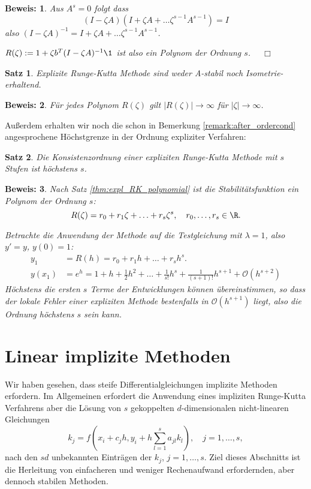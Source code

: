 \documentclass[
]{mycourse}
\theoremstyle{mythm}
\newtheorem{theorem}{Satz}[chapter]
\theoremstyle{break}
\newtheorem*{beweis}{Beweis:}
\begin{document}
\begin{beweis}
Aus $A^s=0$ folgt dass
\[
(I-\zeta A) ( I+\zeta A + \ldots \zeta^{s-1} A^{s-1}) = I
\]
also $(I-\zeta A)^{-1}=I+\zeta A + \ldots \zeta^{s-1} A^{s-1}$.

$R(\zeta):=1+\zeta b^T (I-\zeta A)^{-1} \1$ ist also ein Polynom der Ordnung $s$. $\quad \Box$
\end{beweis}

\begin{theorem}
Explizite Runge-Kutta Methode sind weder A-stabil noch Isometrie-erhaltend.
\end{theorem}
\begin{beweis}
Für jedes Polynom $R(\zeta)$ gilt $|R(\zeta)|\to \infty$ für $|\zeta|\to \infty$. 
\end{beweis}

Außerdem erhalten wir noch die schon in Bemerkung \ref{remark:after_ordercond} angesprochene 
Höchstgrenze in der Ordnung expliziter Verfahren:
\begin{theorem}
Die Konsistenzordnung einer expliziten Runge-Kutta Methode mit $s$ Stufen ist höchstens $s$.
\end{theorem}
\begin{beweis}
Nach Satz \ref{thm:expl_RK_polynomial} ist die Stabilitätsfunktion ein Polynom der Ordnung $s$:
\[
R(\zeta)=r_0+r_1\zeta+\ldots+r_s \zeta^s,\quad r_0,\ldots,r_s\in \R.
\]

Betrachte die Anwendung der Methode auf die Testgleichung mit $\lambda=1$, also $y'=y$, $y(0)=1$:
\begin{align*}
y_1&=R(h)=r_0+r_1 h+\ldots+r_s h^s.\\
y(x_1)&=e^{h}=1+h+\frac{1}{2}h^2+\ldots +\frac{1}{s!} h^s + \frac{1}{(s+1)!} h^{s+1} + \mathcal{O}(h^{s+2})
\end{align*}
Höchstens die ersten $s$ Terme der Entwicklungen können übereinstimmen, so dass der lokale Fehler einer
expliziten Methode bestenfalls in $\mathcal{O}(h^{s+1})$ liegt, also die Ordnung höchstens $s$ sein kann.
\end{beweis}



\section{Linear implizite Methoden}

Wir haben gesehen, dass steife Differentialgleichungen implizite Methoden erfordern. Im Allgemeinen
erfordert die Anwendung eines impliziten Runge-Kutta Verfahrens aber die Lösung
von $s$ gekoppelten $d$-dimensionalen nicht-linearen Gleichungen 
\[
k_j=f(x_i+c_j h, y_i + h \sum_{l=1}^s a_{jl} k_l), \quad j=1,\ldots,s,
\]
nach den $sd$ unbekannten Einträgen der $k_j$, $j=1,\ldots,s$. Ziel dieses Abschnitts 
ist die Herleitung von einfacheren und weniger Rechenaufwand erfordernden, aber dennoch stabilen Methoden.
\end{document}
